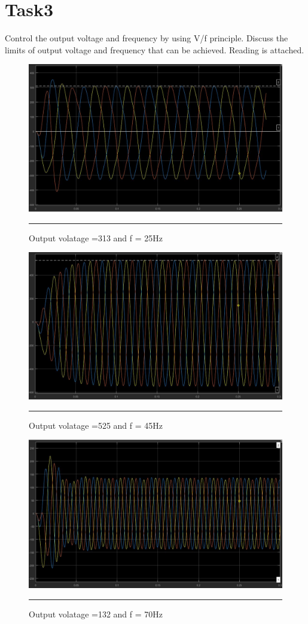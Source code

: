 \section{Task3}
Control the output voltage and frequency by using V/f principle. Discuss the limits of output
voltage and frequency that can be achieved. Reading is attached.
\begin{figure}[htbp]
	\centering
	\includegraphics[width = 6in]{./Figures/Photos/task3/Task3_reading1/V313F25hz.JPG}
	\rule{35em}{1pt}
	\caption{Output volatage =313 and f = 25Hz}
\end{figure}
\begin{figure}[htbp]
	\centering
	\includegraphics[width = 6in]{./Figures/Photos/task3/Task3_reading2/V525F45.JPG}
	\rule{35em}{1pt}
	\caption{Output volatage =525 and f = 45Hz}
\end{figure}
\begin{figure}[htbp]
	\centering
	\includegraphics[width = 6in]{./Figures/Photos/task3/Task3_reading3/V132F70.JPG}
	\rule{35em}{1pt}
	\caption{Output volatage =132 and f = 70Hz}
\end{figure}
